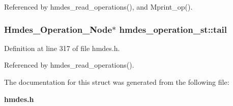 Referenced by hmdes\_\-read\_\-operations(), and Mprint\_\-op().
\subsubsection{\setlength{\rightskip}{0pt plus 5cm}\bf{Hmdes\_\-Operation\_\-Node}$\ast$ \bf{hmdes\_\-operation\_\-st::tail}}\label{structhmdes__operation__st_8e8bc1ba6d615392cd73ebd6e1f317a3}




Definition at line 317 of file hmdes.h.

Referenced by hmdes\_\-read\_\-operations().

The documentation for this struct was generated from the following file:\begin{CompactItemize}
\item 
\bf{hmdes.h}\end{CompactItemize}
